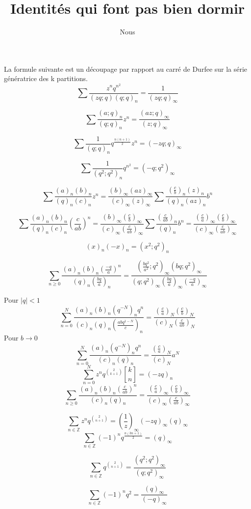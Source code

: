 \documentclass[a4paper,11pt]{article}
\title{Identités qui font pas bien dormir}
\author{Nous}
\begin{document}
\maketitle
La formule suivante est un découpage par rapport au carré de Durfee sur la série
génératrice des k partitions.
$$\sum \frac{z^nq^{n^2}}{(zq;q)(q;q)_n}=\frac{1}{(zq;q)_\infty}$$

$$\sum \frac{(a;q)_n}{(q;q)_n}z^n=\frac{(az;q)_\infty}{(z;q)_\infty}$$

$$\sum \frac{1}{(q;q)_n}q^{\frac{n(n+1)}{2}}z^n=(-zq;q)_\infty$$

$$\sum \frac{1}{(q^2;q^2)_n}q^{n^2}=(-q;q^2)_\infty$$


$$\sum
\frac{(a)_n(b)_n}{(q)_n(c)_n}z^n=
\frac{(b)_\infty(az)_\infty}{(c)_\infty(z)_\infty}
\sum \frac{(\frac{c}{b})_n(z)_n}{(q)_n(az)_n}b^n$$

$$\sum
\frac{(a)_n(b)_n}{(q)_n(c)_n}(\frac{c}{ab})^n=
\frac{(b)_\infty(\frac{c}{b})_\infty}{(c)_\infty(\frac{c}{ab})_\infty}
\sum
\frac{(\frac{c}{ab})_n}{(q)_n}b^n=\frac{(\frac{c}{a})_\infty(\frac{c}{b})_\infty}{(c)_\infty
(\frac{c}{ab})_\infty}$$

$$(x)_n(-x)_n=(x^2;q^2)_n $$

$$
\sum_{n \geq 0}
\frac{(a)_n (b)_n (\frac{-q}{a})^n}{(q)_n (\frac{bq}{a})_n} = 
\frac{(\frac{bq^2}{a^2};q^2)_\infty (bq;q^2)_\infty}{(q;q^2)_\infty (\frac{bq}{a})_\infty (\frac{-q}{a})_\infty}
$$

Pour $|q| < 1$
$$
\sum_{n=0}^N
\frac{(a)_n (b)_n (q^{-N})_n q^n}{(c)_n(q)_n(\frac{abq^{1-N}}{c})_n} =
\frac{(\frac{c}{a})_N (\frac{c}{b})_N}{(c)_N (\frac{c}{ab})_N}
$$
Pour $b\rightarrow 0$
$$
\sum_{n=0}^N
\frac{(a)_n (q^{-N})_n q^n}{(c)_n(q)_n} =
\frac{(\frac{c}{a})_N}{(c)_N}a^N
$$
$$
\sum_{n=0}^{N}z^nq^{2 \choose k+1} {k \brack n} =(-zq)_n
$$
$$
\sum_{n \geq 0}
\frac{(a)_n (b)_n (\frac{c}{ab})^n}{(c)_n(q)_n} =
\frac{(\frac{c}{a})_\infty (\frac{c}{b})_\infty}{(c)_\infty (\frac{c}{ab})_\infty}
$$

$$\sum_{n\in\mathbb{Z}} z^nq^{2\choose n+1} =
(\frac{1}{z})_\infty(-zq)_\infty(q)_\infty$$
$$\sum_{n\in\mathbb{Z}} (-1)^nq^{\frac{n(3n+1)}{2}} =
(q)_\infty$$

$$\sum_{n\in\mathbb{Z}} q^{2 \choose n+1} =
\frac{(q^2;q^2)_\infty}{(q;q^2)_\infty}$$

$$\sum_{n\in\mathbb{Z}} (-1)^nq^{2} =
\frac{(q)_\infty}{(-q)_\infty}$$
\end{document}
